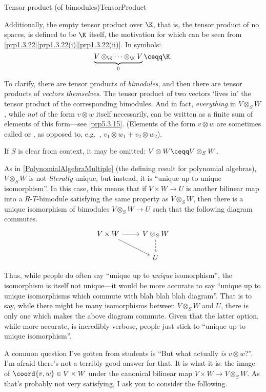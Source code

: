 \begin{thm}{Tensor product (of bimodules)}{TensorProduct}
\begin{rmk}
		Additionally, the empty tensor product over $\K$, that is, the tensor product of no spaces, is defined to be $\K$ itself, the motivation for which can be seen from \cref{prp1.3.22}\cref{prp1.3.22(i)}\cref{prp1.3.22(ii)}.  In symbols:
		\begin{equation}
			\underbrace{V\otimes _{\K}\cdots \otimes _{\K}V}_0\ceqq \K .
		\end{equation}
	\end{rmk}
	\begin{rmk}
		To clarify, there are tensor products of \emph{bimodules}, and then there are tensor products of \emph{vectors themselves}.  The tensor product of two vectors `lives in' the tensor product of the corresponding bimodules.  And in fact, \emph{everything} in $V\otimes _SW$, while \emph{not} of the form $v\otimes w$ itself necessarily, can be written as a finite sum of elements of this form---see \cref{prp5.3.15}.  (Elements of the form $v\otimes w$ are sometimes called  or , as opposed to, e.g.~, $v_1\otimes w_1+v_2\otimes w_2$).
	\end{rmk}
	\begin{rmk}
		If $S$ is clear from context, it may be omitted:  $V\otimes W\ceqq V\otimes _SW$\index[notation]{$V\otimes W$}.
	\end{rmk}
	\begin{rmk}
		As in \cref{PolynomialAlgebraMultiple} (the defining result for polynomial algebras), $V\otimes _SW$ is not \emph{literally} unique, but instead, it is ``unique up to unique isomorphism''.  In this case, this means that if $V\times W\rightarrow U$ is another bilinear map into a $R$-$T$-bimodule satisfying the same property as $V\otimes _SW$, then there is a unique isomorphism of bimodules $V\otimes _SW\rightarrow U$ such that the following diagram commutes.
		\begin{equation}
		\begin{tikzcd}
		V\times W \ar[r] \ar[rd] & V\otimes _SW \ar[d,dashed] \\
		& U
		\end{tikzcd}
		\end{equation}
		
		Thus, while people do often say ``unique up to \emph{unique} isomorphism'', the isomorphism is itself not unique---it would be more accurate to say ``unique up to unique isomorphisms which commute with blah blah blah diagram''.  That is to say, while there might be many isomorphisms between $V\otimes _SW$ and $U$, there is only one which makes the above diagram commute.  Given that the latter option, while more accurate, is incredibly verbose, people just stick to ``unique up to unique isomorphism''.
	\end{rmk}
	\begin{rmk}
		A common question I've gotten from students is ``But what actually \emph{is} $v\otimes w$?''.  I'm afraid there's not a terribly good answer for that.  It is what it is:  the image of $\coord{v,w}\in V\times W$ under the canonical bilinear map $V\times W\rightarrow V\otimes _SW$.  As that's probably not very satisfying, I ask you to consider the following.
		

\end{rmk}
\end{thm}
